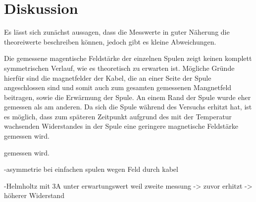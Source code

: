\section{Diskussion}
\label{sec:Diskussion}
Es lässt sich zunächst aussagen, dass die Messwerte in guter Näherung die theoreiwerte
beschreiben können, jedoch gibt es kleine Abweichungen.

Die gemessene magentische Feldstärke der einzelnen Spulen zeigt keinen komplett
symmetrischen Verlauf, wie es theoretisch zu erwarten ist. Mögliche Gründe hierfür sind
die magnetfelder der Kabel, die an einer Seite der Spule angeschlossen sind und somit
auch zum gesamten gemessenen Mangnetfeld beitragen, sowie die Erwärmung der Spule.
An einem Rand der Spule wurde eher gemessen als am anderen. Da sich die Spule
während des Versuchs erhitzt hat, ist es möglich, dass zum späteren Zeitpunkt aufgrund des
mit der Temperatur wachsenden Widerstandes in der Spule eine geringere magnetische Feldstärke
gemessen wird.

gemessen wird.




-asymmetrie bei einfachen spulen wegen Feld durch kabel

-Helmholtz mit 3A unter erwartungswert weil zweite messung -> zuvor erhitzt ->
höherer Widerstand
